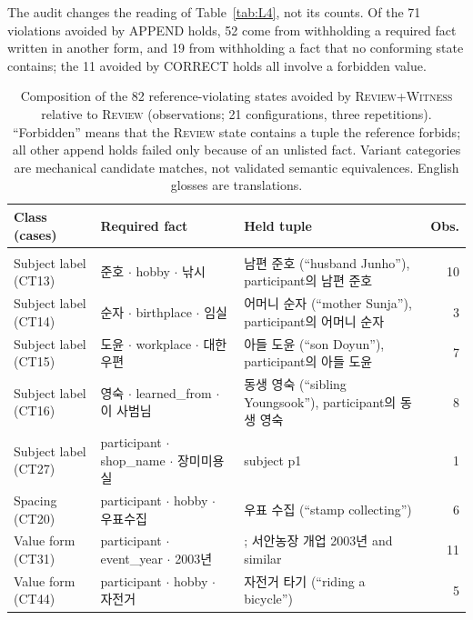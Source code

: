 \documentclass[acmsmall,review]{acmart}
\newcommand{\witness}{\textsc{Witness}}
\newcommand{\review}{\textsc{Review}}
\begin{document}
The audit changes the reading of Table~\ref{tab:L4}, not its counts. Of the 71 violations avoided by APPEND holds, 52 come from withholding a required fact written in another form, and 19 from withholding a fact that no conforming state contains; the 11 avoided by CORRECT holds all involve a forbidden value.
\begin{table}[H]
\centering
\caption{Composition of the 82 reference-violating states avoided by \review{}+\witness{} relative to \review{} (observations; 21 configurations, three repetitions). ``Forbidden'' means that the \review{} state contains a tuple the reference forbids; all other append holds failed only because of an unlisted fact. Variant categories are mechanical candidate matches, not validated semantic equivalences. English glosses are translations.}\label{tab:L9}
\small
\setlength{\tabcolsep}{3pt}
\begin{tabular}{@{}>{\raggedright\arraybackslash}p{}>{\raggedright\arraybackslash}p{}>{\raggedright\arraybackslash}p{}r@{}}
\toprule
\textbf{Class (cases)} & \textbf{Required fact} & \textbf{Held tuple} & \textbf{Obs.} \\
\midrule
\multicolumn{4}{@{}l}{\emph{Append holds, variants of a required fact (52 observations, nine cases)}} \\
Subject label (CT13) & 준호 $\cdot$ hobby $\cdot$ 낚시 & 남편 준호 (``husband Junho''), participant의 남편 준호 & 10 \\
Subject label (CT14) & 순자 $\cdot$ birthplace $\cdot$ 임실 & 어머니 순자 (``mother Sunja''), participant의 어머니 순자 & 3 \\
Subject label (CT15) & 도윤 $\cdot$ workplace $\cdot$ 대한우편 & 아들 도윤 (``son Doyun''), participant의 아들 도윤 & 7 \\
Subject label (CT16) & 영숙 $\cdot$ learned\_from $\cdot$ 이 사범님 & 동생 영숙 (``sibling Youngsook''), participant의 동생 영숙 & 8 \\
Subject label (CT27) & participant $\cdot$ shop\_name $\cdot$ 장미미용실 & subject p1 & 1 \\
Spacing (CT20) & participant $\cdot$ hobby $\cdot$ 우표수집 & 우표 수집 (``stamp collecting'') & 6 \\
Value form (CT31) & participant $\cdot$ event\_year $\cdot$ 2003년 & 2003; 서안농장 개업 2003년 and similar & 11 \\
Value form (CT44) & participant $\cdot$ hobby $\cdot$ 자전거 & 자전거 타기 (``riding a bicycle'') & 5 \\

\end{tabular}
\end{table}
\end{document}
